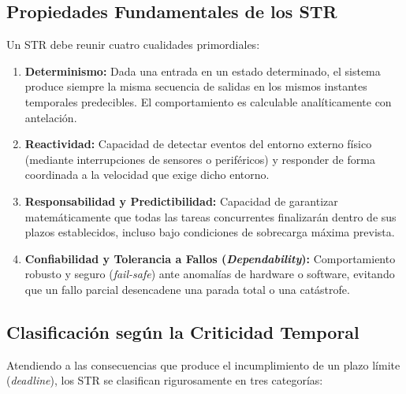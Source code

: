 \subsection{Propiedades Fundamentales de los STR}
Un STR debe reunir cuatro cualidades primordiales:
\begin{enumerate}[leftmargin=*]
    \item \textbf{Determinismo:} Dada una entrada en un estado determinado, el sistema produce siempre la misma secuencia de salidas en los mismos instantes temporales predecibles. El comportamiento es calculable analíticamente con antelación.
    \item \textbf{Reactividad:} Capacidad de detectar eventos del entorno externo físico (mediante interrupciones de sensores o periféricos) y responder de forma coordinada a la velocidad que exige dicho entorno.
    \item \textbf{Responsabilidad y Predictibilidad:} Capacidad de garantizar matemáticamente que todas las tareas concurrentes finalizarán dentro de sus plazos establecidos, incluso bajo condiciones de sobrecarga máxima prevista.
    \item \textbf{Confiabilidad y Tolerancia a Fallos (\textit{Dependability}):} Comportamiento robusto y seguro (\textit{fail-safe}) ante anomalías de hardware o software, evitando que un fallo parcial desencadene una parada total o una catástrofe.
\end{enumerate}

\subsection{Clasificación según la Criticidad Temporal}
Atendiendo a las consecuencias que produce el incumplimiento de un plazo límite (\textit{deadline}), los STR se clasifican rigurosamente en tres categorías:

